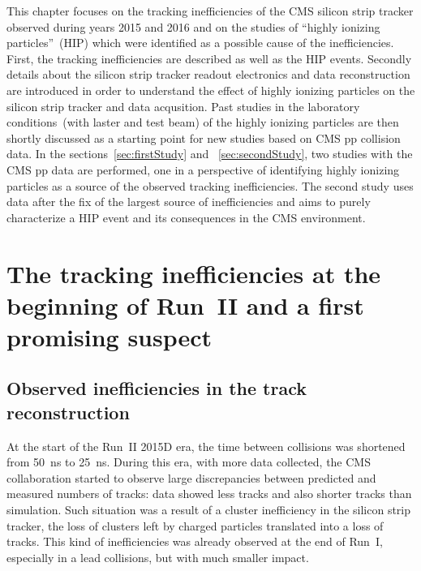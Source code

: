 
\clearpage

\setcounter{secnumdepth}{4}
\setcounter{secnumdepth}{4}

This chapter focuses on the tracking inefficiencies of the CMS silicon strip tracker observed during years 2015 and 2016 and  on the studies of ``highly ionizing particles''~(HIP) which were identified as a possible cause of the inefficiencies. First, the tracking inefficiencies are described as well as the HIP events. Secondly details about the silicon strip tracker readout electronics and data reconstruction are introduced in order to understand the effect of highly ionizing particles on the silicon strip tracker and data acqusition. Past studies in the laboratory conditions~(with laster and test beam) of the highly ionizing particles are then shortly discussed as a starting point for new studies based on CMS pp collision data. In the sections~\ref{sec:firstStudy} and ~\ref{sec:secondStudy}, two studies with the CMS pp data are performed, one in a perspective of identifying highly ionizing particles as a source of the observed tracking inefficiencies. The second study uses data after the fix of the largest source of inefficiencies and aims to purely characterize a HIP event and its consequences in the CMS environment.

\section{The tracking inefficiencies at the beginning of Run~II and a first promising suspect~\label{sec:hitIneff}}

\subsection{Observed inefficiencies in the track reconstruction}

At the start of the Run~II 2015D era, the time between collisions was shortened from 50~ns to 25~ns. During this era, with more data collected, the CMS collaboration started to observe large discrepancies between predicted and measured numbers of tracks: data showed less tracks and also shorter tracks than simulation. Such situation was a result of a cluster inefficiency in the silicon strip tracker, the loss of clusters left by charged particles translated into a loss of tracks. This kind of inefficiencies was already observed at the end of Run~I, especially in a lead collisions, but with much smaller impact. 

